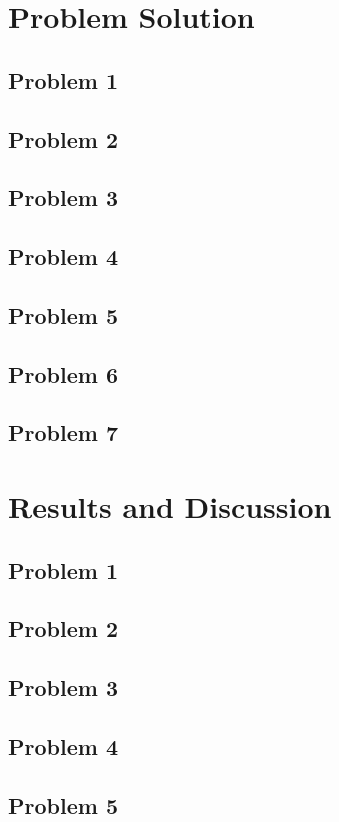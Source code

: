 \documentclass[a4paper]{article}
\begin{document}
\section{Problem Solution} \label{Solutions}
\subsection{Problem 1}
\lipsum[1]
\subsection{Problem 2}
\lipsum[1]
\subsection{Problem 3}
\lipsum[1]
\subsection{Problem 4}
\lipsum[1]
\subsection{Problem 5}
\lipsum[1]
\subsection{Problem 6}
\lipsum[1]
\subsection{Problem 7}
\lipsum[1]

\section{Results and Discussion} \label{Results}
\subsection{Problem 1}
\lipsum[1]
\subsection{Problem 2}
\lipsum[1]
\subsection{Problem 3}
\lipsum[1]
\subsection{Problem 4}
\lipsum[1]
\subsection{Problem 5}
\lipsum[1]
\end{document}
